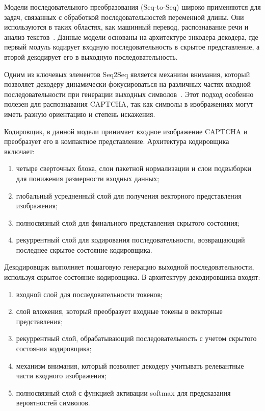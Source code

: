 \documentclass{altsu-report}
\begin{document}
Модели последовательного преобразования (Seq-to-Seq) широко применяются для задач, связанных с обработкой последовательностей переменной длины. Они используются в таких областях, как машинный перевод, распознавание речи и анализ текстов~\cite{Seq2Seq}. Данные модели основаны на архитектуре энкодера-декодера, где первый модуль кодирует входную последовательность в скрытое представление, а второй декодирует его в выходную последовательность.

Одним из ключевых элементов Seq2Seq является механизм внимания, который позволяет декодеру динамически фокусироваться на различных частях входной последовательности при генерации выходных символов~\cite{Seq2SeqBook}. Этот подход особенно полезен для распознавания CAPTCHA, так как символы в изображениях могут иметь разную ориентацию и степень искажения.

Кодировщик, в данной модели принимает входное изображение CAPTCHA и преобразует его в компактное представление. Архитектура кодировщика включает:
\begin{enumerate}
    \item четыре сверточных блока, слои пакетной нормализации и слои подвыборки для понижения размерности входных данных;
    \item глобальный усредненный слой для получения векторного представления изображения;
    \item полносвязный слой для финального представления скрытого состояния;
    \item рекуррентный слой для кодирования последовательности, возвращающий последнее скрытое состояние кодировщика.
\end{enumerate}

Декодировщик выполняет пошаговую генерацию выходной последовательности, используя скрытое состояние кодировщика. В архитектуру декодировщика входят:
\begin{enumerate}
    \item входной слой для последовательности токенов;
    \item слой вложения, который преобразует входные токены в векторные представления;
    \item рекуррентный слой, обрабатывающий последовательность с учетом скрытого состояния кодировщика;
    \item механизм внимания, который позволяет декодеру учитывать релевантные части входного изображения;
    \item полносвязный слой с функцией активации softmax для предсказания вероятностей символов.
\end{enumerate}
\end{document}
